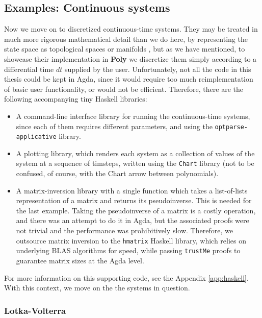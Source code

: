 \subsection{Examples: Continuous systems}
Now we move on to discretized continuous-time systems. They may be treated in much more rigorous mathematical detail than we do here, by representing the state space as topological spaces or manifolds \cite{css}, but as we have mentioned, to showcase their implementation in \textbf{Poly} we discretize them simply according to a differential time $dt$ supplied by the user.
Unfortunately, not all the code in this thesis could be kept in Agda, since it would require too much reimplementation of basic user functionality, or would not be efficient. Therefore, there are the following accompanying tiny Haskell libraries:
\begin{itemize}
    \item A command-line interface library for running the continuous-time systems, since each of them requires different parameters, and using the \texttt{optparse-applicative} \cite{optparse} library.
    \item A plotting library, which renders each system as a collection of values of the system at a sequence of timsteps, written using the \texttt{Chart} \cite{chart-lib} library (not to be confused, of course, with the Chart arrow between polynomials).
    \item A matrix-inversion library with a single function which takes a list-of-lists representation of a matrix and returns its pseudoinverse. This is needed for the last example. Taking the pseudoinverse of a matrix is a costly operation, and there was an attempt to do it in Agda, but the associated proofs were not trivial and the performance was prohibitively slow. Therefore, we outsource matrix inversion to the \texttt{hmatrix} \cite{hmatrix} Haskell library, which relies on underlying BLAS \cite{blas} algorithms for speed, while passing \texttt{trustMe} proofs to guarantee matrix sizes at the Agda level.
\end{itemize}
For more information on this supporting code, see the Appendix \ref{app:haskell}.
With this context, we move on the the systems in question.

\subsubsection{Lotka-Volterra}

